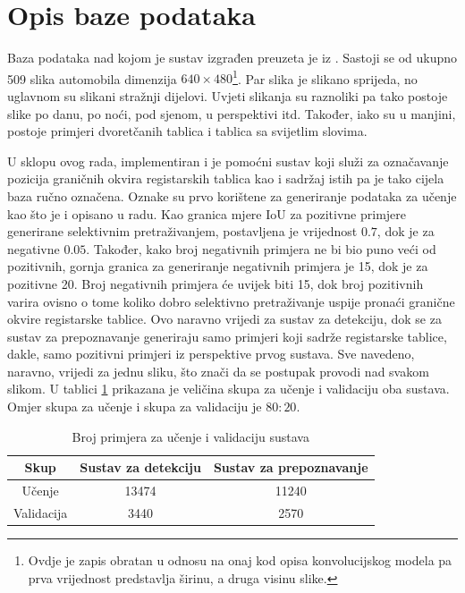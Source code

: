 \documentclass[times, utf8, diplomski]{fer}
\begin{document}
\section{Opis baze podataka}
Baza podataka nad kojom je sustav izgrađen preuzeta je iz \citep{zemris}. Sastoji se od ukupno 509 slika automobila dimenzija $640 \times 480$\footnote{Ovdje je zapis obratan u odnosu na onaj kod opisa konvolucijskog modela pa prva vrijednost predstavlja širinu, a druga visinu slike.}. Par slika je slikano sprijeda, no uglavnom su slikani stražnji dijelovi. Uvjeti slikanja su raznoliki pa tako postoje slike po danu, po noći, pod sjenom, u perspektivi itd. Također, iako su u manjini, postoje primjeri dvoretčanih tablica i tablica sa svijetlim slovima.

U sklopu ovog rada, implementiran i je pomoćni sustav koji služi za označavanje  pozicija graničnih okvira registarskih tablica kao i sadržaj istih pa je tako cijela baza ručno označena. Oznake su prvo korištene za generiranje podataka za učenje kao što je i opisano u radu. Kao granica mjere IoU za pozitivne primjere generirane selektivnim pretraživanjem, postavljena je vrijednost $0.7$, dok je za negativne $0.05$. Također, kako broj negativnih primjera ne bi bio puno veći od pozitivnih, gornja granica za generiranje negativnih primjera je 15, dok je za pozitivne 20. Broj negativnih primjera će uvijek biti 15, dok broj pozitivnih varira ovisno o tome koliko dobro selektivno pretraživanje uspije pronaći granične okvire registarske tablice. Ovo naravno vrijedi za sustav za detekciju, dok se za sustav za prepoznavanje generiraju samo primjeri koji sadrže registarske tablice, dakle, samo pozitivni primjeri iz perspektive prvog sustava. Sve navedeno, naravno, vrijedi za jednu sliku, što znači da se postupak provodi nad svakom slikom. U tablici \ref{tab:data} prikazana je veličina skupa za učenje i validaciju oba sustava. Omjer skupa za učenje i skupa za validaciju je $80:20$.

\begin{table}[H]
    \centering
    \begin{tabular}{|c|c|c|}
        \hline
        Skup & Sustav za detekciju & Sustav za prepoznavanje \\
        \hline \hline
        Učenje & 13474 & 11240 \\
        \hline
        Validacija & 3440 & 2570 \\
        \hline
    \end{tabular}
    \caption{Broj primjera za učenje i validaciju sustava}
    \label{tab:data}
\end{table}
\end{document}
